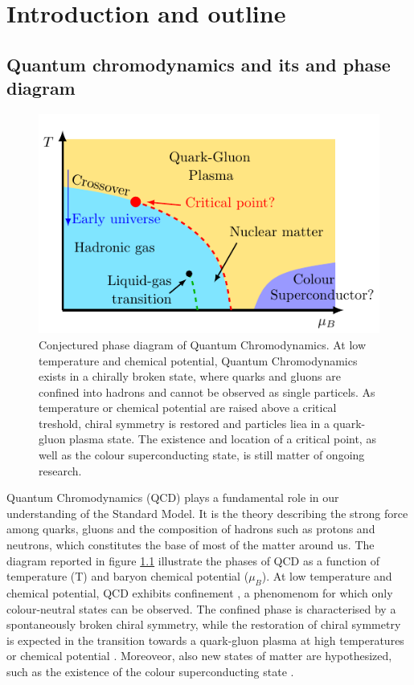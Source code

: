 \chapter{Introduction and outline}
\label{chap:introduction}

\section{Quantum chromodynamics and its and phase diagram}
\begin{figure}[h]
    \centering 
    \includegraphics[scale=1.3]{figures/phase_diagram.pdf}
    \caption[The phase diagram of QCD]{Conjectured phase diagram of Quantum Chromodynamics. At low temperature and chemical potential, Quantum Chromodynamics exists in a chirally broken state, where quarks and gluons are confined into hadrons and cannot be observed as single particels. As temperature or chemical potential are raised above a critical treshold, chiral symmetry is restored and particles liea in a quark-gluon plasma state. The existence and location of a critical point, as well as the colour superconducting state, is still matter of ongoing research.}
    \label{fig:QCD_phase_diagram}
\end{figure}
Quantum Chromodynamics (QCD) plays a fundamental role in our understanding of the Standard Model. It is the theory describing the strong force among quarks, gluons and the composition of hadrons such as protons and neutrons, which constitutes the base of most of the matter around us.
The diagram reported in figure \ref{fig:QCD_phase_diagram} illustrate the phases of QCD as a function of temperature (T) and baryon chemical potential ($\mu_B$).
At low temperature and chemical potential, QCD exhibits confinement \cite{confinement_wilson,confin}, a phenomenom for which only colour-neutral states can be observed. The confined phase is characterised by a spontaneously broken chiral symmetry, while the restoration of chiral symmetry is expected in the transition towards a quark-gluon plasma at high temperatures or chemical potential \cite{Masayuki1989,Stephanov_1998,Berges_1999,doi:10.1142/S0217751X92001757}. Moreoveor, also new states of matter are hypothesized, such as the existence of the colour superconducting state \cite{colorsuper1,colorsuper2,colorsuper3}.
